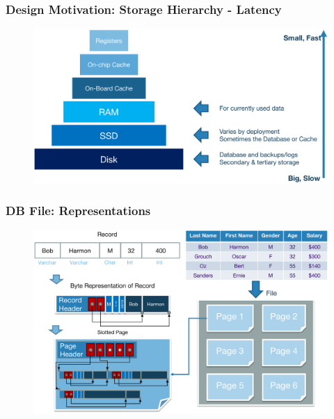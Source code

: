 \begin{frame}[fragile]
	\frametitle{Design Motivation: Storage Hierarchy - Latency}
	\begin{figure}
		\includegraphics[width=0.85\linewidth]{figs/dbfile-latency2.pdf}
	\end{figure}
\end{frame}



\begin{frame}[fragile]
	\frametitle{DB File: Representations}
	\begin{figure}
		\includegraphics[width=0.75\linewidth]{figs/dbfile-representation.pdf}
	\end{figure}
\end{frame}

